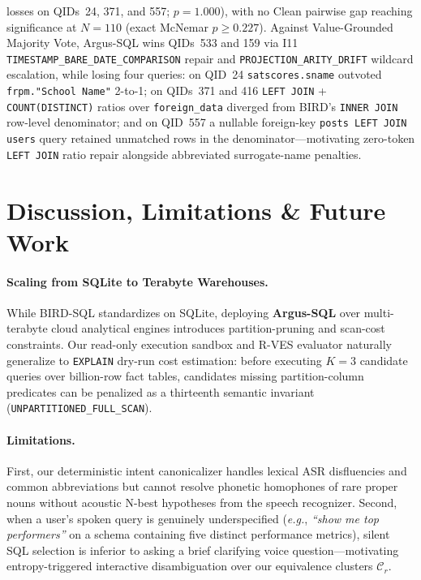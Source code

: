 \documentclass[10pt,twocolumn]{article}
\begin{document}
losses on QIDs~24, 371, and 557; $p = 1.000$), with no Clean pairwise gap reaching significance at $N=110$ (exact McNemar $p \geq 0.227$). Against Value-Grounded Majority Vote, Argus-SQL wins QIDs~533 and 159 via I11 \texttt{TIMESTAMP\_\allowbreak BARE\_\allowbreak DATE\_\allowbreak COMPARISON} repair and \texttt{PROJECTION\_\allowbreak ARITY\_\allowbreak DRIFT} wildcard escalation, while losing four queries: on QID~24 \texttt{satscores.sname} outvoted \texttt{frpm."School Name"} 2-to-1; on QIDs~371 and 416 \texttt{LEFT JOIN} + \texttt{COUNT(DISTINCT)} ratios over \texttt{foreign\_data} diverged from BIRD's \texttt{INNER JOIN} row-level denominator; and on QID~557 a nullable foreign-key \texttt{posts LEFT JOIN users} query retained unmatched rows in the denominator—motivating zero-token \texttt{LEFT JOIN} ratio repair alongside abbreviated surrogate-name penalties.

\section{Discussion, Limitations \& Future Work}

\paragraph{Scaling from SQLite to Terabyte Warehouses.}
While BIRD-SQL standardizes on SQLite, deploying \textbf{Argus-SQL} over multi-terabyte cloud analytical engines introduces partition-pruning and scan-cost constraints. Our read-only execution sandbox and R-VES evaluator naturally generalize to \texttt{EXPLAIN} dry-run cost estimation: before executing $K=3$ candidate queries over billion-row fact tables, candidates missing partition-column predicates can be penalized as a thirteenth semantic invariant (\texttt{UNPARTITIONED\_FULL\_SCAN}).

\paragraph{Limitations.}
First, our deterministic intent canonicalizer handles lexical ASR disfluencies and common abbreviations but cannot resolve phonetic homophones of rare proper nouns without acoustic N-best hypotheses from the speech recognizer. Second, when a user's spoken query is genuinely underspecified (\emph{e.g.}, \emph{``show me top performers''} on a schema containing five distinct performance metrics), silent SQL selection is inferior to asking a brief clarifying voice question—motivating entropy-triggered interactive disambiguation over our equivalence clusters $\mathcal{C}_r$.
\end{document}
